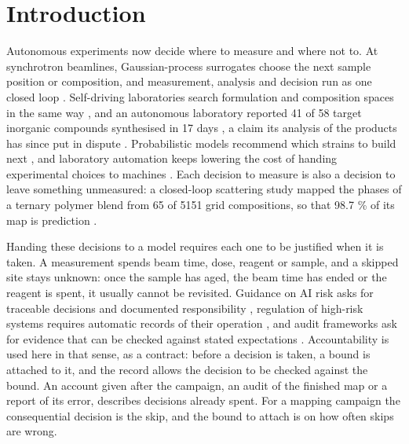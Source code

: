 \documentclass{iopjournal}
\begin{document}
\hypertarget{sec:1}{%
\section{Introduction}\label{sec:1}}

Autonomous experiments now decide where to measure and where not to. At synchrotron beamlines, Gaussian-process surrogates choose the next sample position or composition, and measurement, analysis and decision run as one closed loop \cite{Noack2019,Noack2020,Yager2023}. Self-driving laboratories search formulation and composition spaces in the same way \cite{Burger2020,Nazeri2026}, and an autonomous laboratory reported 41 of 58 target inorganic compounds synthesised in 17 days \cite{Szymanski2023}, a claim its analysis of the products has since put in dispute \cite{Leeman2024}. Probabilistic models recommend which strains to build next \cite{Radivojevic2020}, and laboratory automation keeps lowering the cost of handing experimental choices to machines \cite{Tom2024}. Each decision to measure is also a decision to leave something unmeasured: a closed-loop scattering study mapped the phases of a ternary polymer blend from 65 of 5151 grid compositions, so that 98.7 \% of its map is prediction \cite{Upreti2026}.

Handing these decisions to a model requires each one to be justified when it is taken. A measurement spends beam time, dose, reagent or sample, and a skipped site stays unknown: once the sample has aged, the beam time has ended or the reagent is spent, it usually cannot be revisited. Guidance on AI risk asks for traceable decisions and documented responsibility \cite{NIST2023}, regulation of high-risk systems requires automatic records of their operation \cite[Art. 12]{EU2024}, and audit frameworks ask for evidence that can be checked against stated expectations \cite{Raji2020}. Accountability is used here in that sense, as a contract: before a decision is taken, a bound is attached to it, and the record allows the decision to be checked against the bound. An account given after the campaign, an audit of the finished map or a report of its error, describes decisions already spent. For a mapping campaign the consequential decision is the skip, and the bound to attach is on how often skips are wrong.
\end{document}
